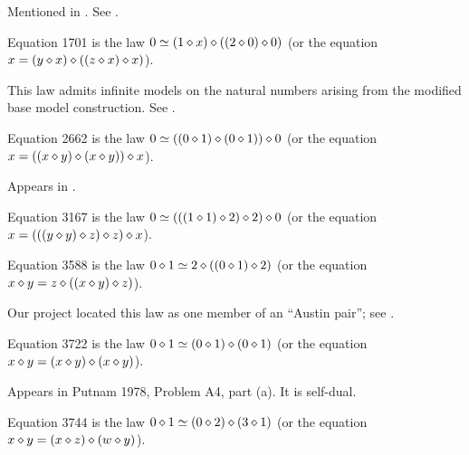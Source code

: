 Mentioned in \cite{Kisielewicz2}.  See .

\begin{definition}[Equation 1701]\label{eq1701}\leanok{}  Equation 1701 is the law $0 \simeq  (1 \diamond x) \diamond ((2 \diamond 0) \diamond 0)$ (or the equation $x = (y \diamond x) \diamond ((z \diamond x) \diamond x)$).
\end{definition}

This law admits infinite models on the natural numbers arising from the modified base model construction. See .

\begin{definition}[Equation 2662]\label{eq2662}\leanok{}  Equation 2662 is the law $0 \simeq  ((0 \diamond 1) \diamond (0 \diamond 1)) \diamond 0$ (or the equation $x = ((x \diamond y) \diamond (x \diamond y)) \diamond x$).
\end{definition}

Appears in \cite{mendelsohn-padmanabhan}.

\begin{definition}[Equation 3167]\label{eq3167}\leanok{}  Equation 3167 is the law $0 \simeq  (((1 \diamond 1) \diamond 2) \diamond 2) \diamond 0$ (or the equation $x = (((y \diamond y) \diamond z) \diamond z) \diamond x$).
\end{definition}


\begin{definition}[Equation 3588]
  \label{eq3588}\leanok{}
  Equation 3588 is the law $0 \diamond 1 \simeq 2 \diamond ((0 \diamond 1) \diamond 2)$ (or the equation $x \diamond y = z \diamond ((x \diamond y) \diamond z)$).
\end{definition}

Our project located this law as one member of an ``Austin pair''; see .

\begin{definition}[Equation 3722]\label{eq3722}\leanok{}  Equation 3722 is the law $0 \diamond 1  \simeq  (0 \diamond 1) \diamond (0 \diamond 1)$ (or the equation $x \diamond y = (x \diamond y) \diamond (x \diamond y)$).
\end{definition}

Appears in Putnam 1978, Problem A4, part (a).  It is self-dual.

\begin{definition}[Equation 3744]\label{eq3744}\leanok{}  Equation 3744 is the law $0 \diamond 1  \simeq  (0 \diamond 2) \diamond (3 \diamond 1)$ (or the equation $x \diamond y = (x \diamond z) \diamond (w \diamond y)$).
\end{definition}

